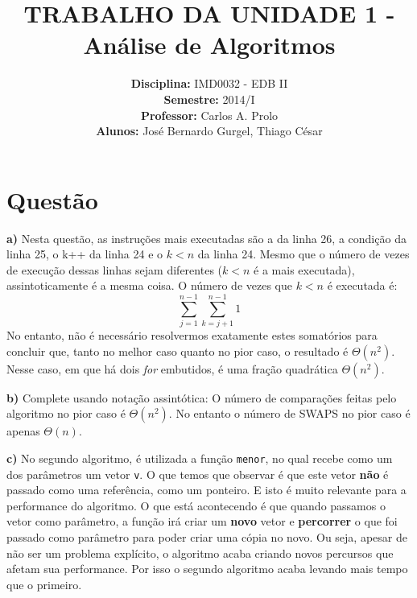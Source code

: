 \documentclass[a4paper,12pt]{article}
\title{TRABALHO DA UNIDADE 1 - Análise de Algoritmos}
\author{
\textbf{Disciplina:} IMD0032 - EDB II
\\\textbf{Semestre:} 2014/I
\\\textbf{Professor:} Carlos A. Prolo
\\\textbf{Alunos:} José Bernardo Gurgel, Thiago César
}
\date{} %
\begin{document}
	
\maketitle
\section{Questão}
\begin{description}
    \item{\textbf{a)}} Nesta questão, as instruções mais executadas são a da linha 26, a condição da linha 25, o k++ da linha 24 e o $k < n$ da linha 24. Mesmo que o número de vezes de execução dessas linhas sejam diferentes ($k < n$ é a mais executada), assintoticamente é a mesma coisa. O número de vezes que $k < n$ é executada é:
	$$
	\sum_{j=1}^{n-1} \sum_{k=j+1}^{n-1} 1
	$$
No entanto, não é necessário resolvermos exatamente estes somatórios para concluir que, tanto no melhor caso quanto no pior caso, o resultado é $\Theta(n^2)$. Nesse caso, em que há dois \textit{for} embutidos, é uma fração quadrática $\Theta(n^2)$.

	\item{\textbf{b)}} Complete usando notação assintótica: O número de comparações feitas pelo algoritmo no pior caso é \underline{$\Theta(n^2)$}. No entanto o número de SWAPS no pior caso é apenas \underline{$\Theta(n)$}.
	\item{\textbf{c)}} No segundo algoritmo, é utilizada a função \texttt{menor}, no qual recebe como um dos parâmetros um vetor \texttt{v}. O que temos que observar é que este vetor \textbf{não} é passado como uma referência, como um ponteiro. E isto é muito relevante para a performance do algoritmo. O que está acontecendo é que quando passamos o vetor como parâmetro, a função irá criar um \textbf{novo} vetor e \textbf{percorrer} o que foi passado como parâmetro para poder criar uma cópia no novo. Ou seja, apesar de não ser um problema explícito, o algoritmo acaba criando novos percursos que afetam sua performance. Por isso o segundo algoritmo acaba levando mais tempo que o primeiro.
\end{description}

\end{document}
